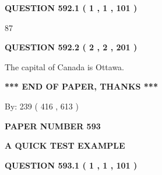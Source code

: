 \documentclass[12pt]{article}
\begin{document}
{\textbf{\Large{QUESTION
592.1 
 ( 1 , 1 , 101 )
}}}
  
  
 
 
\noindent{}

87
 
 
  
\vspace{0.2in}
  
{\textbf{\Large{QUESTION
592.2 
 ( 2 , 2 , 201 )
}}}
  
  
 
 
\noindent{}
 
 
The capital of Canada is Ottawa.
 
 
 
 
   
   
 \vspace{0.2in}
 
   
   
   
   
\vspace{1.0in} 
{\textbf{\large{ *** END OF PAPER, THANKS *** }}} 
   
   
\hspace{1.0in} By: 
 239 ( 416 ,  613 )
   
   
   
   
\newpage 
\setcounter{page}{ 
   593001 } 
   
   
   
   
 {\textbf{ \Large{ PAPER NUMBER  593  }}}
   
   
\vspace{0.2in}
   
   
   
   
   
   
 \vspace{0.2in}
{\LARGE {\textbf{ A QUICK TEST EXAMPLE}}}
   
   
  
\vspace{0.2in}
  
{\textbf{\Large{QUESTION
593.1 
 ( 1 , 1 , 101 )
}}}
  
  
 
 
\noindent{}
\end{document}
